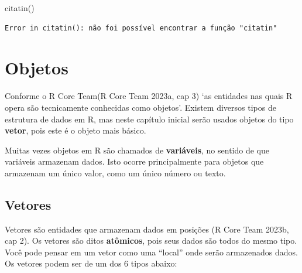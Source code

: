 \documentclass[
  letterpaper,
  DIV=11,
  numbers=noendperiod]{scrreprt}
\newenvironment{Shaded}{\begin{snugshade}}{\end{snugshade}}
\newcommand{\FunctionTok}[1]{\textcolor[rgb]{0.28,0.35,0.67}{#1}}
\newcommand{\NormalTok}[1]{\textcolor[rgb]{0.00,0.23,0.31}{#1}}
\begin{document}
\begin{Shaded}
\begin{Highlighting}[]
\FunctionTok{citatin}\NormalTok{()}
\end{Highlighting}
\end{Shaded}

\begin{verbatim}
Error in citatin(): não foi possível encontrar a função "citatin"
\end{verbatim}

\hypertarget{objetos}{%
\section{Objetos}\label{objetos}}

Conforme o R Core Team(R Core Team 2023a, cap 3) `as entidades nas quais
R opera são tecnicamente conhecidas como objetos'. Existem diversos
tipos de estrutura de dados em R, mas neste capítulo inicial serão
usados objetos do tipo \textbf{vetor}, pois este é o objeto mais básico.

\begin{tcolorbox}[enhanced jigsaw, bottomtitle=1mm, colframe=quarto-callout-note-color-frame, coltitle=black, left=2mm, opacitybacktitle=0.6, opacityback=0, breakable, arc=.35mm, titlerule=0mm, title=\textcolor{quarto-callout-note-color}{\faInfo}\hspace{0.5em}{Variáveis}, colbacktitle=quarto-callout-note-color!10!white, toptitle=1mm, leftrule=.75mm, bottomrule=.15mm, toprule=.15mm, colback=white, rightrule=.15mm]

Muitas vezes objetos em R são chamados de \textbf{variáveis}, no sentido
de que variáveis armazenam dados. Isto ocorre principalmente para
objetos que armazenam um único valor, como um único número ou texto.

\end{tcolorbox}

\hypertarget{vetores}{%
\subsection{Vetores}\label{vetores}}

Vetores são entidades que armazenam dados em posições (R Core Team
2023b, cap 2). Os vetores são ditos \textbf{atômicos}, pois seus dados
são todos do mesmo tipo. Você pode pensar em um vetor como uma ``local''
onde serão armazenados dados. Os vetores podem ser de um dos 6 tipos
abaixo:
\end{document}

